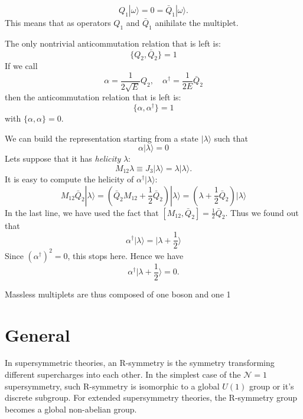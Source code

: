 \begin{equation}
  Q_1|\omega\rangle = 0 = \bar{Q}_{\dot{1}}|\omega\rangle.
\end{equation}
This means that as operators $Q_1$ and $\bar{Q}_{\dot{1}}$ anihilate the
multiplet. 
\par The only nontrivial anticommutation relation that is left is:
\begin{equation}
  \{Q_2,\bar{Q}_{\dot{2}}\} = 1
\end{equation}
If we call
\begin{equation}
  \alpha = \frac{1}{2\sqrt{E}}Q_2,\quad \alpha^\dagger
  = \frac{1}{2E}\bar{Q}_{\dot{2}}
\end{equation}
then the anticommutation relation that is left is:
\begin{equation}
  \{\alpha,\alpha^\dagger\} = 1
\end{equation}
with $\{\alpha,\alpha\} = 0$.

We can build the representation starting from a state $|\lambda\rangle$ such
that
\begin{equation}
  \alpha|\lambda\rangle = 0
\end{equation}
Lets suppose that it has \textit{helicity} $\lambda$:
\begin{equation}
  M_{12}\lambda \equiv J_3|\lambda\rangle = \lambda|\lambda\rangle.
\end{equation}
It is easy to compute the helicity of $\alpha^{\dagger}|\lambda\rangle$:
\begin{equation}
  M_{12} \bar{Q}_{\dot{2}}|\lambda\rangle
  = \left(\bar{Q}_{\dot{2}}M_{12}+\frac{1}{2}\bar{Q}_{\dot{2}}\right)|\lambda\rangle
  = (\lambda+\frac{1}{2}\bar{Q}_{\dot{2}})|\lambda\rangle 
\end{equation}
In the last line, we have used the fact that
$\left[M_{12},\bar{Q}_{\dot{2}}\right]=\frac{1}{2}\bar{Q}_{\dot{2}}$. Thus we
found out that
\begin{equation}
  \alpha^\dagger|\lambda\rangle  = |\lambda+ \frac{1}{2}\rangle 
\end{equation}
Since $(\alpha^\dagger)^2 = 0$, this stops here. Hence we have
\begin{equation}
  \alpha^\dagger|\lambda+\frac{1}{2}\rangle = 0.
\end{equation}
\par
Massless multiplets are thus composed of one boson and one 1
\section{General}
\begin{definition}[R-symmetry]
In supersymmetric theories, an R-symmetry is the symmetry transforming different supercharges into each other. In the simplest case of the $\mathcal{N}=1$ supersymmetry, such R-symmetry is isomorphic to a global $U(1)$ group or it's discrete subgroup. For extended supersymmetry theories, the R-symmetry group becomes a global non-abelian group.  
\end{definition}

